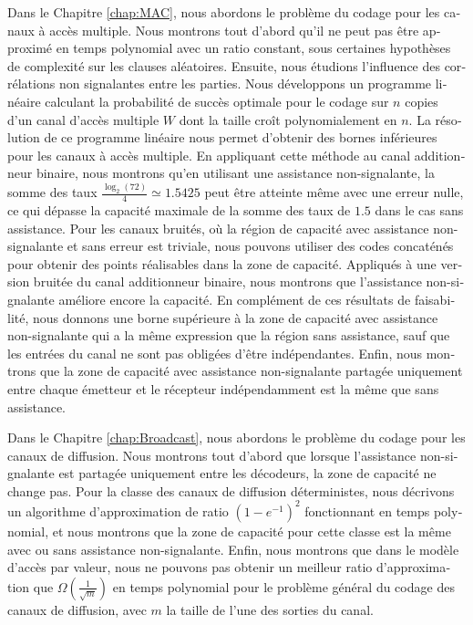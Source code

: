 \begin{otherlanguage}{french}
Dans le Chapitre \ref{chap:MAC}, nous abordons le problème du codage pour les canaux à accès multiple. Nous montrons tout d'abord qu'il ne peut pas être approximé en temps polynomial  avec un ratio constant, sous certaines hypothèses de complexité sur les clauses aléatoires. Ensuite, nous étudions l'influence des corrélations non signalantes entre les parties. Nous développons un programme linéaire calculant la probabilité de succès optimale pour le codage sur $n$ copies d'un canal d'accès multiple $W$ dont la taille croît polynomialement en $n$. La résolution de ce programme linéaire nous permet d'obtenir des bornes inférieures pour les canaux à accès multiple. En appliquant cette méthode au canal additionneur binaire, nous montrons qu'en utilisant une assistance non-signalante, la somme des taux $\frac{\log_2(72)}{4} \simeq 1.5425$ peut être atteinte même avec une erreur nulle, ce qui dépasse la capacité maximale de la somme des taux de $1.5$ dans le cas sans assistance. Pour les canaux bruités, où la région de capacité avec assistance non-signalante et sans erreur est triviale, nous pouvons utiliser des codes concaténés pour obtenir des points réalisables dans la zone de capacité. Appliqués à une version bruitée du canal additionneur binaire, nous montrons que l'assistance non-signalante améliore encore la capacité. En complément de ces résultats de faisabilité, nous donnons une borne supérieure à la zone de capacité avec assistance non-signalante qui a la même expression que la région sans assistance, sauf que les entrées du canal ne sont pas obligées d'être indépendantes. Enfin, nous montrons que la zone de capacité avec assistance non-signalante partagée uniquement entre chaque émetteur et le récepteur indépendamment est la même que sans assistance.

Dans le Chapitre \ref{chap:Broadcast}, nous abordons le problème du codage pour les canaux de diffusion. Nous montrons tout d'abord que lorsque l'assistance non-signalante est partagée uniquement entre les décodeurs, la zone de capacité ne change pas. Pour la classe des canaux de diffusion déterministes, nous décrivons un algorithme d'approximation de ratio $(1-e^{-1})^2$ fonctionnant en temps polynomial, et nous montrons que la zone de capacité pour cette classe est la même avec ou sans assistance non-signalante. Enfin, nous montrons que dans le modèle d'accès par valeur, nous ne pouvons pas obtenir un meilleur ratio d'approximation que $\Omega\left(\frac{1}{\sqrt{m}}\right)$ en temps polynomial pour le problème général du codage des canaux de diffusion, avec $m$ la taille de l'une des sorties du canal.
\end{otherlanguage}

